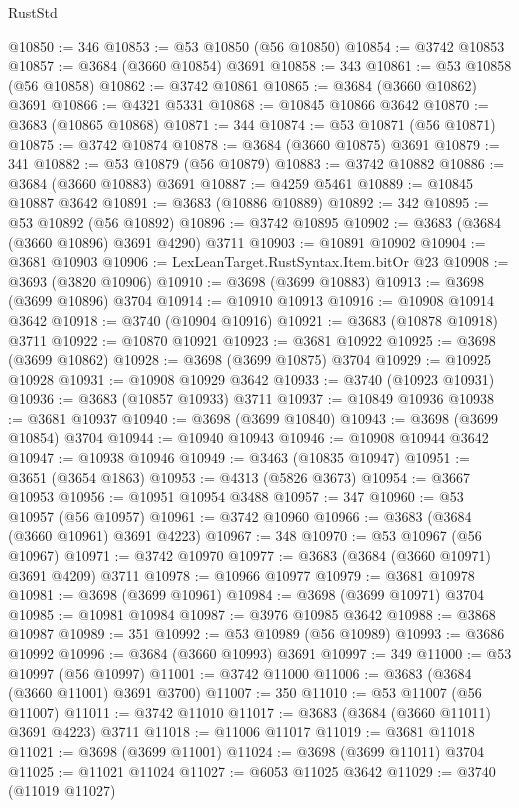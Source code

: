 \begin{lexlean}{RustStd}
\begin{coremodule}
{\begin{coremodule}
{{{{{{{{{{{{{{{{{{{{{{{{{{{{{{{{{{{{{{{{{{{{{{{@10850 := 346
@10853 := @53 @10850 (@56 @10850)
@10854 := @3742 @10853
@10857 := @3684 (@3660 @10854) @3691
@10858 := 343
@10861 := @53 @10858 (@56 @10858)
@10862 := @3742 @10861
@10865 := @3684 (@3660 @10862) @3691
@10866 := @4321 @5331
@10868 := @10845 @10866 @3642
@10870 := @3683 (@10865 @10868)
@10871 := 344
@10874 := @53 @10871 (@56 @10871)
@10875 := @3742 @10874
@10878 := @3684 (@3660 @10875) @3691
@10879 := 341
@10882 := @53 @10879 (@56 @10879)
@10883 := @3742 @10882
@10886 := @3684 (@3660 @10883) @3691
@10887 := @4259 @5461
@10889 := @10845 @10887 @3642
@10891 := @3683 (@10886 @10889)
@10892 := 342
@10895 := @53 @10892 (@56 @10892)
@10896 := @3742 @10895
@10902 := @3683 (@3684 (@3660 @10896) @3691 @4290) @3711
@10903 := @10891 @10902
@10904 := @3681 @10903
@10906 := LexLeanTarget.RustSyntax.Item.bitOr @23
@10908 := @3693 (@3820 @10906)
@10910 := @3698 (@3699 @10883)
@10913 := @3698 (@3699 @10896) @3704
@10914 := @10910 @10913
@10916 := @10908 @10914 @3642
@10918 := @3740 (@10904 @10916)
@10921 := @3683 (@10878 @10918) @3711
@10922 := @10870 @10921
@10923 := @3681 @10922
@10925 := @3698 (@3699 @10862)
@10928 := @3698 (@3699 @10875) @3704
@10929 := @10925 @10928
@10931 := @10908 @10929 @3642
@10933 := @3740 (@10923 @10931)
@10936 := @3683 (@10857 @10933) @3711
@10937 := @10849 @10936
@10938 := @3681 @10937
@10940 := @3698 (@3699 @10840)
@10943 := @3698 (@3699 @10854) @3704
@10944 := @10940 @10943
@10946 := @10908 @10944 @3642
@10947 := @10938 @10946
@10949 := @3463 (@10835 @10947)
@10951 := @3651 (@3654 @1863)
@10953 := @4313 (@5826 @3673)
@10954 := @3667 @10953
@10956 := @10951 @10954 @3488
@10957 := 347
@10960 := @53 @10957 (@56 @10957)
@10961 := @3742 @10960
@10966 := @3683 (@3684 (@3660 @10961) @3691 @4223)
@10967 := 348
@10970 := @53 @10967 (@56 @10967)
@10971 := @3742 @10970
@10977 := @3683 (@3684 (@3660 @10971) @3691 @4209) @3711
@10978 := @10966 @10977
@10979 := @3681 @10978
@10981 := @3698 (@3699 @10961)
@10984 := @3698 (@3699 @10971) @3704
@10985 := @10981 @10984
@10987 := @3976 @10985 @3642
@10988 := @3868 @10987
@10989 := 351
@10992 := @53 @10989 (@56 @10989)
@10993 := @3686 @10992
@10996 := @3684 (@3660 @10993) @3691
@10997 := 349
@11000 := @53 @10997 (@56 @10997)
@11001 := @3742 @11000
@11006 := @3683 (@3684 (@3660 @11001) @3691 @3700)
@11007 := 350
@11010 := @53 @11007 (@56 @11007)
@11011 := @3742 @11010
@11017 := @3683 (@3684 (@3660 @11011) @3691 @4223) @3711
@11018 := @11006 @11017
@11019 := @3681 @11018
@11021 := @3698 (@3699 @11001)
@11024 := @3698 (@3699 @11011) @3704
@11025 := @11021 @11024
@11027 := @6053 @11025 @3642
@11029 := @3740 (@11019 @11027)
}}}}}}}}}}}}}}}}}}}}}}}}}}}}}}}}}}}}}}}}}}}}}}}
\end{coremodule}}
\end{coremodule}
\end{lexlean}
